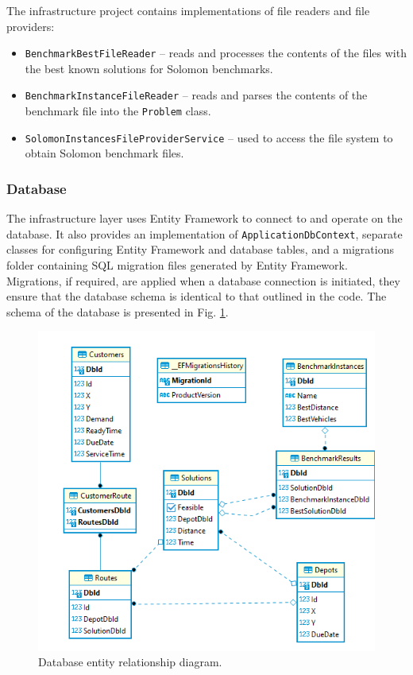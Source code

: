 \documentclass[a4paper,twoside,12pt]{book}
\begin{document}
The infrastructure project contains implementations of file readers and file providers:
\begin{itemize}
    \item \lstinline{BenchmarkBestFileReader} -- reads and processes the contents of the files with the best known solutions for Solomon benchmarks.
    \item \lstinline{BenchmarkInstanceFileReader} --  reads and parses the contents of the benchmark file into the \lstinline{Problem} class.
    \item \lstinline{SolomonInstancesFileProviderService} -- used to access the file system to obtain Solomon benchmark files.
\end{itemize}

\subsubsection{Database}

The infrastructure layer uses Entity Framework to connect to and operate on the database. It also provides an implementation of \lstinline{ApplicationDbContext}, separate classes for configuring Entity Framework and database tables, and a migrations folder containing SQL migration files generated by Entity Framework. Migrations, if required, are applied when a database connection is initiated, they ensure that the database schema is identical to that outlined in the code. The schema of the database is presented in Fig. \ref{fig:erdDb}.
\begin{figure}[htb]
\centering
\includegraphics[width=\textwidth]{images/dbERD.png}
\caption{Database entity relationship diagram.}
\label{fig:erdDb}
\end{figure}
\end{document}
